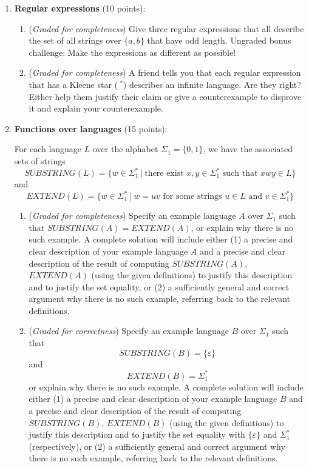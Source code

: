 \documentclass[12pt, oneside]{article}
\newcommand{\gradeCorrect}{({\it Graded for correctness}) }
\newcommand{\gradeComplete}{({\it Graded for completeness}) }
\begin{document}
\begin{enumerate}[wide, labelwidth=!, labelindent=0pt]
\item\textbf{Regular expressions} (10 points):

    \begin{enumerate}
    \item\gradeComplete  Give three regular expressions that all describe the set of all strings over $\{a,b\}$ that have 
    odd length. Ungraded bonus challenge: Make the expressions as different as possible!

    \item\gradeComplete  A friend tells you that each regular expression that has a Kleene star ($~^*$) describes an
    infinite language. Are they right? Either help them justify their claim or give a counterexample to disprove it
    and explain your counterexample.

    \end{enumerate}

\item\textbf{Functions over languages} (15 points):

For each language $L$ over the alphabet $\Sigma_1 = \{0,1\}$, we have the 
associated sets of strings
\[
    SUBSTRING(L) = \{ w \in \Sigma_1^* ~|~ \text{there exist } x,y \in \Sigma_1^* \text{ such that } xwy \in L\}
\]
and 
\[
    EXTEND(L) = \{ w \in \Sigma_1^* ~|~ w = uv \text{ for some strings } u \in L \text{ and } v \in \Sigma_1^* \}
\]
    \begin{enumerate}
    \item\gradeComplete Specify an example language $A$ over $\Sigma_1$ such that 
    $SUBSTRING(A) = EXTEND(A)$, 
    or explain why there is no such example. 
    A complete solution will include either (1) a precise and
    clear description of your example language $A$ 
    and a precise and clear description of
    the result of computing $SUBSTRING(A)$, $EXTEND(A)$ (using the given definitions)
    to justify this description and to justify the set equality,
    or (2) a sufficiently general and correct argument
    why there is no such example, referring back to the relevant definitions.

    \item\gradeCorrect Specify an example language $B$ over $\Sigma_1$ such that 
    $$SUBSTRING(B) = \{\varepsilon\}$$ and $$EXTEND(B) = \Sigma_1^*$$
    or explain why there is no such example. 
    A complete solution will include either (1) a precise and
    clear description of your example language $B$ 
    and a precise and clear description of
    the result of computing $SUBSTRING(B)$, $EXTEND(B)$ (using the given definitions)
    to justify this description and to justify the set equality with 
    $\{\varepsilon\}$ and $\Sigma_1^*$ (respectively), or (2) a sufficiently general and correct argument
    why there is no such example, referring back to the relevant definitions.


\end{enumerate}
\end{enumerate}
\end{document}
